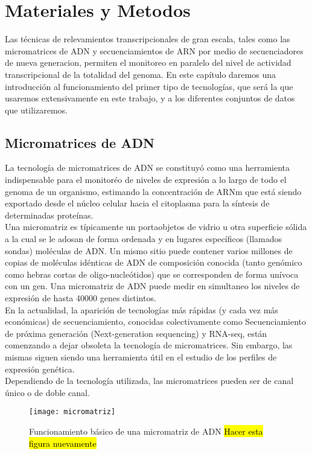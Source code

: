 \chapter{Materiales y Metodos}\label{materiales_y_metodos}
Las técnicas de relevamientos transcripcionales de gran escala, tales como las micromatrices de ADN y secuenciamientos de ARN por medio de secuenciadores de nueva generacion, permiten el monitoreo en paralelo del nivel de actividad transcripcional de la totalidad del genoma. En este capítulo daremos una introducción al funcionamiento del primer tipo de tecnologías, que será la que usaremos extensivamente en este trabajo, y a los diferentes conjuntos de datos que utilizaremos.\cite{Bose2016}

\section{Micromatrices de ADN}
La tecnología de micromatrices de ADN se constituyó como una herramienta indispensable para el monitoréo de niveles de expresión a lo largo de todo el genoma de un organismo, estimando la concentración de ARNm que está siendo exportado desde el núcleo celular hacia el citoplasma para la síntesis de determinadas proteínas.\\
Una micromatriz es típicamente un portaobjetos de vidrio u otra superficie sólida a la cual se le adosan de forma ordenada y en lugares específicos (llamados sondas) moléculas de ADN. Un mismo sitio puede contener varios millones de copias de moléculas idénticas de ADN de composición conocida (tanto genómico como hebras cortas de oligo-nucleótidos) que se corresponden de forma unívoca con un gen. Una micromatriz de ADN puede medir en simultaneo los niveles de expresión de hasta 40000 genes distintos.\\
En la actualidad, la aparición de tecnologías más rápidas (y cada vez más económicas) de secuenciamiento, conocidas colectivamente como Secuenciamiento de próxima generación (Next-generation sequencing) y RNA-seq, están comenzando a dejar obsoleta la tecnología de micromatrices. Sin embargo, las mismas siguen siendo una herramienta útil en el estudio de los perfiles de expresión genética.\\
Dependiendo de la tecnología utilizada, las micromatrices pueden ser de canal único o de doble canal.\\
\begin{figure}[h]
    \centering
    \texttt{[image: micromatriz]}
    \caption{Funcionamiento básico de una micromatriz de ADN \hl{Hacer esta figura nuevamente}}
    \label{fig:micromatriz}
\end{figure}
